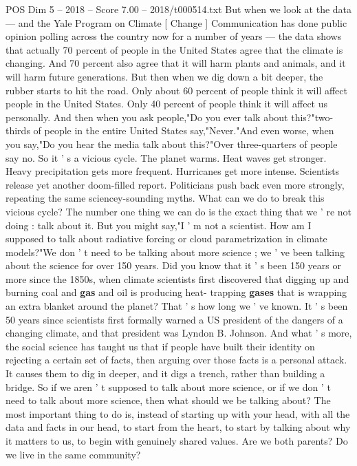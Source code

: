 \begin{textsample}{POS Dim 5 – 2018 – Score 7.00 – 2018/t000514.txt}
But when we look at the data — and the Yale Program on Climate [ Change ] Communication has done public opinion polling across the country now for a number of years — the data shows that actually 70 percent of people in the United States agree that the climate is changing.
And 70 percent also agree that it will harm plants and animals, and it will harm future generations.
But then when we dig down a bit deeper, the rubber starts to hit the road.
Only about 60 percent of people think it will affect people in the United States.
Only 40 percent of people think it will affect us personally.
And then when you ask people,"Do you ever talk about this?"two-thirds of people in the entire United States say,"Never."And even worse, when you say,"Do you hear the media talk about this?"Over three-quarters of people say no.
So it ' s a vicious cycle.
The planet warms.
Heat waves get stronger.
Heavy precipitation gets more frequent.
Hurricanes get more intense.
Scientists release yet another doom-filled report.
Politicians push back even more strongly, repeating the same sciencey-sounding myths.
What can we do to break this vicious cycle?
The number one thing we can do is the exact thing that we ' re not doing : talk about it.
But you might say,"I ' m not a scientist.
How am I supposed to talk about radiative forcing or cloud parametrization in climate models?"We don ' t need to be talking about more science ; we ' ve been talking about the science for over 150 years.
Did you know that it ' s been 150 years or more since the 1850s, when climate scientists first discovered that digging up and burning coal and \textbf{gas} and oil is producing heat- trapping \textbf{gases} that is wrapping an extra blanket around the planet?
That ' s how long we ' ve known.
It ' s been 50 years since scientists first formally warned a US president of the dangers of a changing climate, and that president was Lyndon B.
Johnson.
And what ' s more, the social science has taught us that if people have built their identity on rejecting a certain set of facts, then arguing over those facts is a personal attack.
It causes them to dig in deeper, and it digs a trench, rather than building a bridge.
So if we aren ' t supposed to talk about more science, or if we don ' t need to talk about more science, then what should we be talking about?
The most important thing to do is, instead of starting up with your head, with all the data and facts in our head, to start from the heart, to start by talking about why it matters to us, to begin with genuinely shared values.
Are we both parents?
Do we live in the same community?

\end{textsample}
